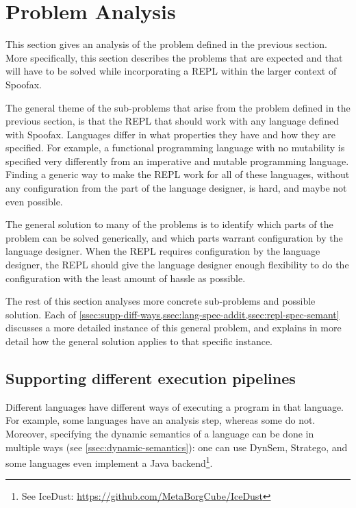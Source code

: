 \section{Problem Analysis}
\label{sec:problem-analysis}
This section gives an analysis of the problem defined in the previous
section. More specifically, this section describes the problems that
are expected and that will have to be solved while incorporating a
REPL within the larger context of Spoofax.

The general theme of the sub-problems that arise from the problem
defined in the previous section, is that the REPL that should work
with any language defined with Spoofax. Languages differ in what
properties they have and how they are specified. For example, a
functional programming language with no mutability is specified very
differently from an imperative and mutable programming
language. Finding a generic way to make the REPL work for all of these
languages, without any configuration from the part of the language
designer, is hard, and maybe not even possible.

The general solution to many of the problems is to identify which
parts of the problem can be solved generically, and which parts
warrant configuration by the language designer. When the REPL requires
configuration by the language designer, the REPL should give the
language designer enough flexibility to do the configuration with the
least amount of hassle as possible.

The rest of this section analyses more concrete sub-problems and
possible solution. Each of
\cref{ssec:supp-diff-ways,ssec:lang-spec-addit,ssec:repl-spec-semant}
discusses a more detailed instance of this general problem, and
explains in more detail how the general solution applies to that
specific instance.


\subsection{Supporting different execution pipelines}
\label{ssec:supp-diff-ways}
Different languages have different ways of executing a program in that
language. For example, some languages have an analysis step, whereas
some do not. Moreover, specifying the dynamic semantics of a language
can be done in multiple ways (see \cref{ssec:dynamic-semantics}): one
can use DynSem, Stratego, and some languages even implement a Java
backend\footnote{See IceDust:
  \url{https://github.com/MetaBorgCube/IceDust}}.

